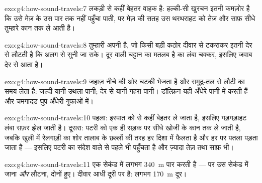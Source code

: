 \begin{solution}{exo:g4:how-sound-travels:7}
लकड़ी  से कहीं बेहतर वाहक है: हल्की-सी खुरचन इतनी कमज़ोर है कि 
उसे मेज़ के उस पार तक नहीं पहुँचा पाती, पर  मेज़ की सतह उस
थरथराहट को तेज़ और साफ़ सीधे तुम्हारे कान तक ले आती है।
\end{solution}

\begin{solution}{exo:g4:how-sound-travels:8}
 तुम्हारी अपनी  है, जो किसी बड़ी कठोर दीवार से टकराकर
इतनी देर से लौटती है कि अलग से सुनी जा सके। दूर वाली चट्टान का मतलब
है  का लंबा चक्कर, इसलिए जवाब देर से आता है।
\end{solution}

\begin{solution}{exo:g4:how-sound-travels:9}
जहाज़ नीचे की ओर चटकी भेजता है और समुद्र-तल से लौटी  का समय
लेता है: जल्दी  यानी उथला पानी; देर से  यानी गहरा
पानी। डॉल्फ़िन यही अँधेरे पानी में करती हैं और चमगादड़ घुप अँधेरी
गुफाओं में।
\end{solution}

\begin{solution}{exo:g4:how-sound-travels:10}
पहला: इस्पात  को  से कहीं बेहतर ले जाता है, इसलिए गड़गड़ाहट
लंबा सफ़र झेल जाती है। दूसरा: पटरी  को एक ही सड़क पर सीधे खोजी के
कान तक ले जाती है, जबकि खुली  में रेलगाड़ी का शोर तालाब के छल्लों
की तरह हर दिशा में फैलता है और हर  पर पतला पड़ता जाता है ---
इसलिए पटरी का संदेश  वाले से पहले भी पहुँचता है और ज़्यादा तेज़
तथा साफ़ भी।
\end{solution}

\begin{solution}{exo:g4:how-sound-travels:11}
एक सेकंड में  लगभग \qty{340}{m} पार करती है --- पर उस सेकंड में
जाना \emph{और} लौटना, दोनों हुए। दीवार आधी दूरी पर है: लगभग
\qty{170}{m} दूर।
\end{solution}
